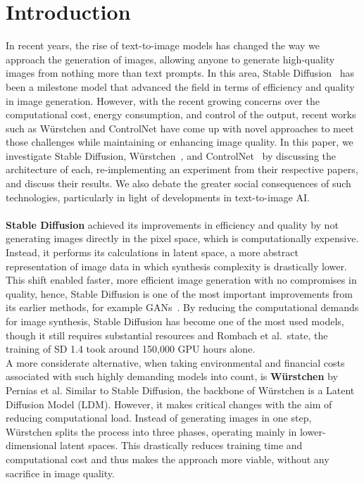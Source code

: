 \section{Introduction}
In recent years, the rise of text-to-image models has changed the way we approach the generation of images, allowing anyone to generate high-quality images from nothing more than text prompts. In this area, Stable Diffusion~\cite{rombach2022stablediffusion} has been a milestone model that advanced the field in terms of efficiency and quality in image generation. However, with the recent growing concerns over the computational cost, energy consumption, and control of the output, recent works such as Würstchen and ControlNet have come up with novel approaches to meet those challenges while maintaining or enhancing image quality. In this paper, we investigate Stable Diffusion, Würstchen~\cite{pernias2024wrstchen}, and ControlNet~\cite{zhang2023addingconditionalcontroltexttoimage} by discussing the architecture of each, re-implementing an experiment from their respective papers, and discuss their results. We also debate the greater social consequences of such technologies, particularly in light of developments in text-to-image AI.
\\
\\
\noindent
\textbf{Stable Diffusion} achieved its improvements in efficiency and quality by not generating images directly in the pixel space, which is computationally expensive. Instead, it performs its calculations in latent space, a more abstract representation of image data in which synthesis complexity is drastically lower. This shift enabled faster, more efficient image generation with no compromises in quality, hence, Stable Diffusion is one of the most important improvements from its earlier methods, for example GANs~\cite{dhariwal2021diffusionmodelsbeatgans}. By reducing the computational demands for image synthesis, Stable Diffusion has become one of the most used models, though it still requires substantial resources and Rombach et al.\ state, the training of SD 1.4 took around 150,000 GPU hours alone.
\\
\noindent
A more considerate alternative, when taking environmental and financial costs associated with such highly demanding models into count, is \textbf{Würstchen} by Pernias et al. Similar to Stable Diffusion, the backbone of Würstchen is a Latent Diffusion Model (LDM). However, it makes critical changes with the aim of reducing computational load. Instead of generating images in one step, Würstchen splits the process into three phases, operating mainly in lower-dimensional latent spaces. This drastically reduces training time and computational cost and thus makes the approach more viable, without any sacrifice in image quality.
